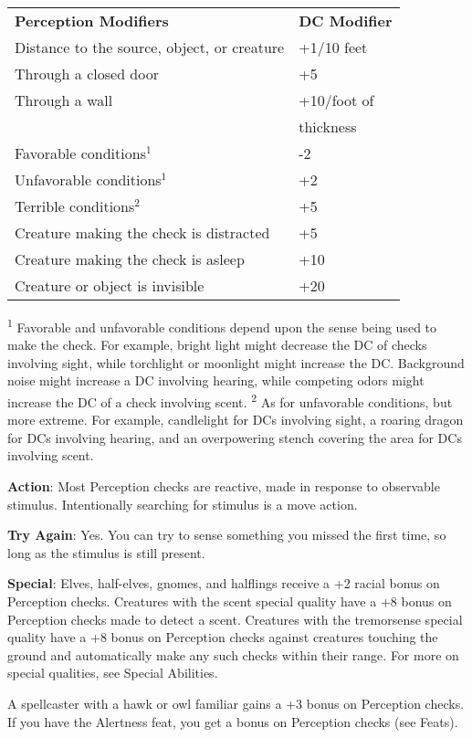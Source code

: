 \begin{table}
\sffamily
 \begin{tabularx}{\linewidth}{Xl}
\textbf{Perception Modifiers} & \textbf{DC Modifier}\\
Distance to the source, object, or creature & +1/10 feet\\
Through a closed door & +5\\
Through a wall & +10/foot of \\
               & thickness\\
Favorable conditions\(^{1}\) & -2\\
Unfavorable conditions\(^{1}\) & +2\\
Terrible conditions\(^{2}\) & +5\\
Creature making the check is distracted & +5\\
Creature making the check is asleep & +10\\
Creature or object is invisible & +20\\
 \end{tabularx}
\textsuperscript{1} Favorable and unfavorable conditions depend upon the sense being used to make the check. For example, bright light might decrease the DC of checks involving sight, while torchlight or moonlight might increase the DC. Background noise might increase a DC involving hearing, while competing odors might increase the DC of a check involving scent.
\textsuperscript{2} As for unfavorable conditions, but more extreme. For example, candlelight for DCs involving sight, a roaring dragon for DCs involving hearing, and an overpowering stench covering the area for DCs involving scent.
\end{table}		
\textbf{Action}: Most Perception checks are reactive, made in response to observable stimulus. Intentionally searching for stimulus is a move action.
				
\textbf{Try Again}: Yes. You can try to sense something you missed the first time, so long as the stimulus is still present.
				
\textbf{Special}: Elves, half-elves, gnomes, and halflings receive a +2 racial bonus on Perception checks. Creatures with the scent special quality have a +8 bonus on Perception checks made to detect a scent. Creatures with the tremorsense special quality have a +8 bonus on Perception checks against creatures touching the ground and automatically make any such checks within their range. For more on special qualities, see Special Abilities.
				
A spellcaster with a hawk or owl familiar gains a +3 bonus on Perception checks. If you have the Alertness feat, you get a bonus on Perception checks (see Feats).
        	
